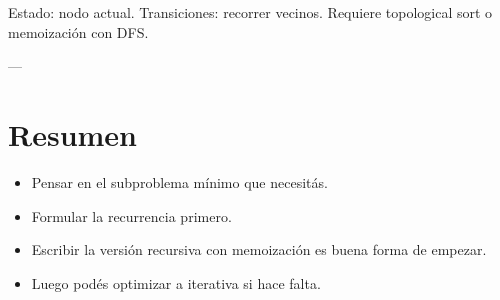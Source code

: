 Estado: nodo actual.  
Transiciones: recorrer vecinos.  
Requiere topological sort o memoización con DFS.

---

\section{Resumen}

\begin{itemize}
	\item Pensar en el subproblema mínimo que necesitás.
	\item Formular la recurrencia primero.
	\item Escribir la versión recursiva con memoización es buena forma de empezar.
	\item Luego podés optimizar a iterativa si hace falta.
\end{itemize}
